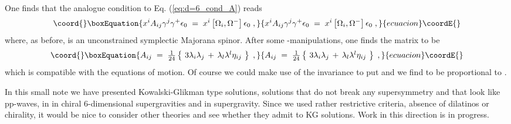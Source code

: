\documentclass[a4paper,12pt]{article}
\begin{document}
One finds that the analogue condition to Eq. (\ref{eq:d=6_cond_A}) reads
\begin{equation}\coord{}\boxEquation{
 x^{i}A_{ij}\gamma^{j}\gamma^{+}\epsilon_{0} \;=\; x^{i}\left[
                                \Omega_{i},\Omega^{-}
                                  \right] \epsilon_{0} \; ,
}{
 x^{i}A_{ij}\gamma^{j}\gamma^{+}\epsilon_{0} \;=\; x^{i}\left[
                                \Omega_{i},\Omega^{-}
                                  \right] \epsilon_{0} \; ,
}{ecuacion}\coordE{}\end{equation}
where, as before, \coordHE{} is an unconstrained symplectic Majorana spinor.
After some \myHighlight{$\gamma$}\coordHE{}-manipulations, one finds the matrix \coordHE{} to be
\begin{equation}\coord{}\boxEquation{
 A_{ij} \;=\; \textstyle{\frac{1}{24}}\left\{ \ 3\lambda_{i}\lambda_{j}\,+\,
                                                \lambda_{l}\lambda^{l}\eta_{ij}
                                      \ \right\} \; ,
}{
 A_{ij} \;=\; \textstyle{\frac{1}{24}}\left\{ \ 3\lambda_{i}\lambda_{j}\,+\,
                                                \lambda_{l}\lambda^{l}\eta_{ij}
                                      \ \right\} \; ,
}{ecuacion}\coordE{}\end{equation}
which is compatible with the equations of motion.
Of course we could make use of the \coordHE{} invariance to put \coordHE{}
and we find \coordHE{} to be proportional to \coordHE{}.
%
%






%
%
\par
In this small note we have presented Kowalski-Glikman type solutions, solutions
that do not break any supersymmetry and that look like pp-waves, in 
in chiral 6-dimensional supergravities and in \coordHE{}  \coordHE{} supergravity.
Since we used rather restrictive criteria, absence of dilatinos or
chirality, it would be nice to consider other theories and see whether
they admit to KG solutions. Work in this direction is in progress.
%
%
\end{document}
